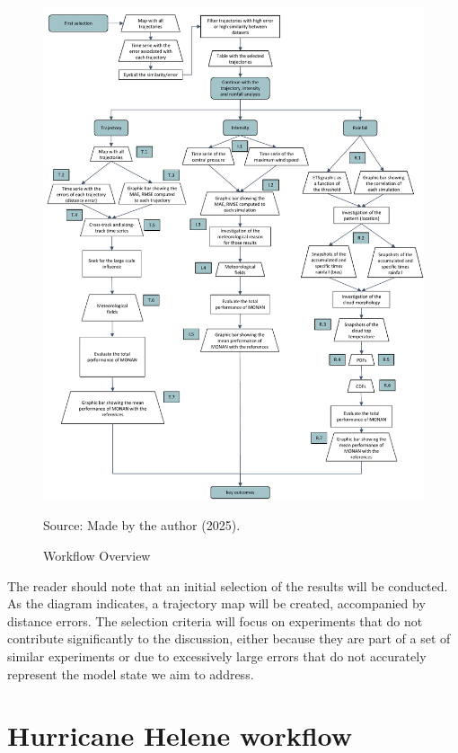 \begin{figure}[p]
    \centering
    \caption{Workflow Overview}
    \label{fig:workflow}\includegraphics[width=\textwidth,height=\textheight,keepaspectratio]{docs/figuras/ch_3.4.0.1/WORKFLOW.pdf}

    \vspace{0.5em}
    
    \centering
    Source: Made by the author (2025).
\end{figure}

The reader should note that an initial selection of the results will be conducted. As the diagram indicates, a trajectory map will be created, accompanied by distance errors. The selection criteria will focus on experiments that do not contribute significantly to the discussion, either because they are part of a set of similar experiments or due to excessively large errors that do not accurately represent the model state we aim to address.

\section{Hurricane Helene workflow}